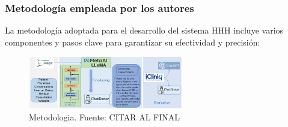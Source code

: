 \subsubsection{Metodología empleada por los autores}
	La metodología adoptada para el desarrollo del sistema HHH incluye varios componentes y pasos clave para garantizar su efectividad y precisión:

	\begin{figure}[h]
		\begin{center}
			\includegraphics[width=0.6\textwidth]{2/1_antecedentes/Metodologia-7.png}
			\caption{Metodologia. Fuente: CITAR AL FINAL }
		\end{center}
	\end{figure}

